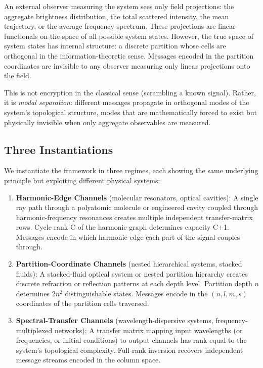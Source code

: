 \documentclass[11pt,twocolumn,a4paper]{article}
\theoremstyle{definition}
\begin{document}
An external observer measuring the system sees only field projections: the aggregate brightness distribution, the total scattered intensity, the mean trajectory, or the average frequency spectrum. These projections are linear functionals on the space of all possible system states. However, the true space of system states has internal structure: a discrete partition whose cells are orthogonal in the information-theoretic sense. Messages encoded in the partition coordinates are invisible to any observer measuring only linear projections onto the field.

This is not encryption in the classical sense (scrambling a known signal). Rather, it is \emph{modal separation}: different messages propagate in orthogonal modes of the system's topological structure, modes that are mathematically forced to exist but physically invisible when only aggregate observables are measured.

\subsection{Three Instantiations}

We instantiate the framework in three regimes, each showing the same underlying principle but exploiting different physical systems:

\begin{enumerate}[nosep]
\item \textbf{Harmonic-Edge Channels} (molecular resonators, optical cavities): A single ray path through a polyatomic molecule or engineered cavity coupled through harmonic-frequency resonances creates multiple independent transfer-matrix rows. Cycle rank C of the harmonic graph determines capacity C+1. Messages encode in which harmonic edge each part of the signal couples through.

\item \textbf{Partition-Coordinate Channels} (nested hierarchical systems, stacked fluids): A stacked-fluid optical system or nested partition hierarchy creates discrete refraction or reflection patterns at each depth level. Partition depth $n$ determines $2n^2$ distinguishable states. Messages encode in the $(n,l,m,s)$ coordinates of the partition cells traversed.

\item \textbf{Spectral-Transfer Channels} (wavelength-dispersive systems, frequency-multiplexed networks): A transfer matrix mapping input wavelengths (or frequencies, or initial conditions) to output channels has rank equal to the system's topological complexity. Full-rank inversion recovers independent message streams encoded in the column space.
\end{enumerate}
\end{document}
